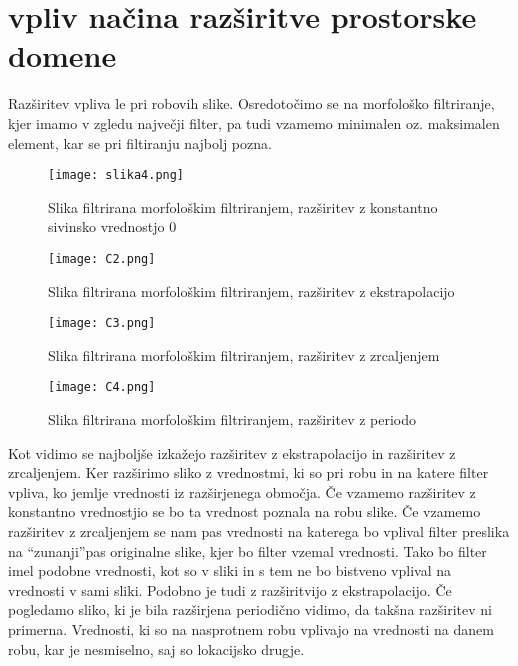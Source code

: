 \documentclass[12pt,a4paper]{article}
\begin{document}
\section{vpliv načina razširitve prostorske domene}
Razširitev vpliva le pri robovih slike. Osredotočimo se na morfološko filtriranje, kjer imamo v zgledu največji filter, pa tudi vzamemo minimalen oz. maksimalen element, kar se pri filtiranju najbolj pozna. 
\pagebreak
\begin{figure}[h!]
  \begin{center}
    \texttt{[image: slika4.png]}
    \caption{Slika filtrirana morfološkim filtriranjem, razširitev z konstantno sivinsko vrednostjo 0}
    \label{fig:}
  \end{center}
\end{figure}
\begin{figure}[h!]
  \begin{center}
    \texttt{[image: C2.png]}
    \caption{Slika filtrirana morfološkim filtriranjem, razširitev z ekstrapolacijo}
    \label{fig:}
  \end{center}
\end{figure}
\pagebreak
\begin{figure}[h!]
  \begin{center}
    \texttt{[image: C3.png]}
    \caption{Slika filtrirana morfološkim filtriranjem, razširitev z zrcaljenjem}
    \label{fig:}
  \end{center}
\end{figure}
\begin{figure}[h!]
  \begin{center}
    \texttt{[image: C4.png]}
    \caption{Slika filtrirana morfološkim filtriranjem, razširitev z periodo}
    \label{fig:}
  \end{center}
\end{figure}

Kot vidimo se najboljše izkažejo razširitev z ekstrapolacijo in razširitev z zrcaljenjem. Ker razširimo sliko z vrednostmi, ki so pri robu in na katere filter vpliva, ko jemlje vrednosti iz razširjenega območja. Če vzamemo razširitev z konstantno vrednostjio se bo ta vrednost poznala na robu slike. Če vzamemo razširitev z zrcaljenjem se nam pas vrednosti na katerega bo vplival filter preslika na \textquotedblleft zunanji\textquotedblright  pas originalne slike, kjer bo filter vzemal vrednosti. Tako bo filter imel podobne vrednosti, kot so v sliki in s tem ne bo bistveno vplival na vrednosti v sami sliki. Podobno je tudi z razširitvijo z ekstrapolacijo. Če pogledamo sliko, ki je bila razširjena periodično vidimo, da takšna razširitev ni primerna. Vrednosti, ki so na nasprotnem robu vplivajo na vrednosti na danem robu, kar je nesmiselno, saj so lokacijsko drugje.  
\end{document}
